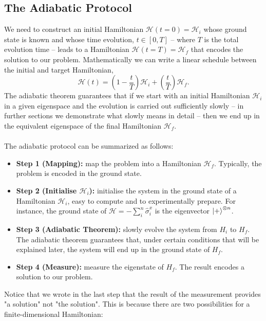 \subsection{The Adiabatic Protocol}
We need to construct an initial Hamiltonian $\mathcal{H}(t=0) = \mathcal{H}_{i}$ whose ground state is known and whose time evolution, $t \in \left[0,T\right]$ -- where $T$ is the total evolution time -- leads to a Hamiltonian $\mathcal{H}(t=T) = \mathcal{H}_{f}$ that encodes the solution to our problem. Mathematically we can write a linear schedule between the initial and target Hamiltonian,
\begin{equation}
\label{eq:Htime}
    \mathcal{H}(t) = \left(1-\frac{t}{T}\right)\mathcal{H}_{i} + \left(\frac{t}{T} \right)\mathcal{H}_{f}.
\end{equation}
The adiabatic theorem guarantees that if we start with an initial Hamiltonian $\mathcal{H}_{i}$ in a given eigenspace and the evolution is carried out sufficiently slowly -- in further sections we demonstrate what slowly means in detail -- then we end up in the equivalent eigenspace of the final Hamiltonian $\mathcal{H}_{f}$. \\\\
The adiabatic protocol can be summarized as follows:
\begin{itemize}
    \item \textbf{Step 1 (Mapping):} map the problem into a Hamiltonian $\mathcal{H}_{f}$. Typically, the problem is encoded in the ground state.
    \item \textbf{Step 2 (Initialise $\mathcal{H}_{i}$):} initialise the system in the ground state of a Hamiltonian $\mathcal{H}_{i}$, easy to compute and to experimentally prepare. For instance, the ground state of $\mathcal{H} = - \sum_{i}^{n}\hat{\sigma}_{i}^{x}$ is the eigenvector $\ket{+}^{\otimes n}$.
    \item \textbf{Step 3 (Adiabatic Theorem):} slowly evolve the system from $H_{i}$ to $H_{f}$. The adiabatic theorem guarantees that, under certain conditions that will be explained later, the system will end up in the ground state of $H_{f}$.
    \item \textbf{Step 4 (Measure):} measure the eigenstate of $H_{f}$. The result encodes a solution to our problem.
\end{itemize}
Notice that we wrote in the last step that the result of the measurement provides "a solution" not "the solution". This is because there are two possibilities for a finite-dimensional Hamiltonian:
